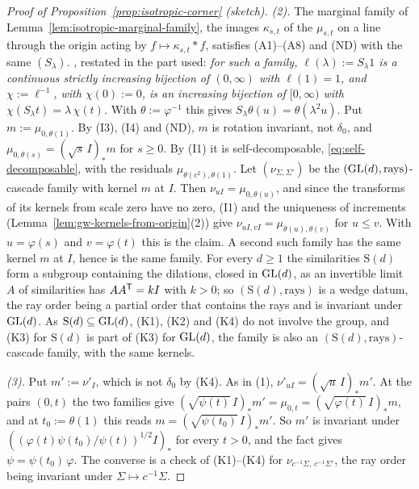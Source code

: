 \begin{proof}[Proof of Proposition~\ref{prop:isotropic-corner} (sketch)]
\emph{(2).} The marginal family of Lemma~\ref{lem:isotropic-marginal-family}, the images
$\kappa_{s,t}$ of the $\mu_{s,t}$ on a line through the origin acting by $f \mapsto \kappa_{s,t} * f$,
satisfies (A1)--(A8) and (ND) with the same $(S_\lambda)$. , restated in the part used:
\emph{for such a family, $\ell(\lambda) := S_\lambda 1$ is a continuous strictly increasing bijection of
$(0,\infty)$ with $\ell(1) = 1$, and $\chi := \ell^{-1}$, with $\chi(0) := 0$, is an increasing bijection of
$[0,\infty)$ with $\chi(S_\lambda t) = \lambda\,\chi(t)$.} With $\theta := \varphi^{-1}$ this gives
$S_\lambda\theta(u) = \theta(\lambda^2 u)$. Put $m := \mu_{0,\theta(1)}$. By (I3), (I4) and (ND),
$m$ is rotation invariant, not $\delta_0$, and $\mu_{0,\theta(s)} = (\sqrt s\,I)_*m$ for $s \ge 0$.
By (I1) it is self-decomposable, \ref{eq:self-decomposable}, with the residuals
$\mu_{\theta(c^2),\theta(1)}$. Let $(\nu_{\Sigma,\Sigma'})$ be the $(\mathrm{GL}(d), \text{rays})$-cascade
family with kernel $m$ at $I$. Then $\nu_{uI} = \mu_{0,\theta(u)}$, and since the transforms of its
kernels from scale zero have no zero, (I1) and the uniqueness of increments
(Lemma~\ref{lem:gw-kernels-from-origin}(2)) give
$\nu_{uI,vI} = \mu_{\theta(u),\theta(v)}$ for $u \le v$. With $u = \varphi(s)$ and $v = \varphi(t)$
this is the claim. A second such family has the same kernel $m$ at $I$, hence is the same family.
For every $d \ge 1$ the similarities $\mathrm S(d)$ form a subgroup containing the dilations, closed
in $\mathrm{GL}(d)$, as an invertible limit $A$ of similarities has $AA^{\mathsf{T}} = kI$ with $k > 0$; so
$(\mathrm S(d), \text{rays})$ is a wedge datum, the ray order being a partial order that contains the rays and is invariant
under $\mathrm{GL}(d)$.
As $\mathrm S(d) \subseteq \mathrm{GL}(d)$, (K1), (K2) and (K4) do not involve the group, and (K3) for
$\mathrm S(d)$ is part of (K3) for $\mathrm{GL}(d)$, the family is also an
$(\mathrm S(d), \text{rays})$-cascade family, with the same kernels.

\emph{(3).} Put $m' := \nu'_I$, which is not $\delta_0$ by (K4). As in (1),
$\nu'_{uI} = (\sqrt u\,I)_*m'$. At the pairs $(0, t)$ the two families give
$(\sqrt{\psi(t)}\,I)_*m' = \mu_{0,t} = (\sqrt{\varphi(t)}\,I)_*m$, and at $t_0 := \theta(1)$ this
reads $m = (\sqrt{\psi(t_0)}\,I)_*m'$. So $m'$ is invariant under
$((\varphi(t)\psi(t_0)/\psi(t))^{1/2}I)_*$ for every $t > 0$, and the fact gives
$\psi = \psi(t_0)\,\varphi$. The converse is a check of (K1)--(K4) for
$\nu_{c^{-1}\Sigma,\,c^{-1}\Sigma'}$, the ray order being invariant under $\Sigma \mapsto c^{-1}\Sigma$.


\end{proof}
